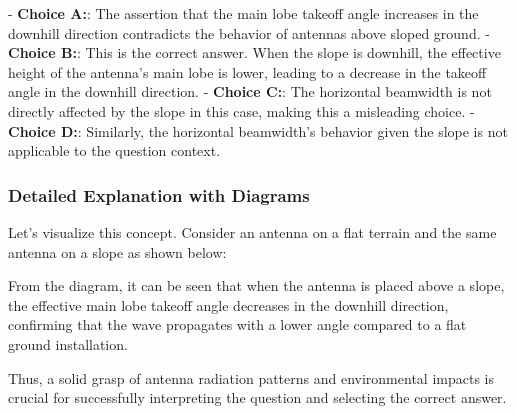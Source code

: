 - \textbf{Choice A:}: The assertion that the main lobe takeoff angle increases in the downhill direction contradicts the behavior of antennas above sloped ground.
- \textbf{Choice B:}: This is the correct answer. When the slope is downhill, the effective height of the antenna's main lobe is lower, leading to a decrease in the takeoff angle in the downhill direction. 
- \textbf{Choice C:}: The horizontal beamwidth is not directly affected by the slope in this case, making this a misleading choice.
- \textbf{Choice D:}: Similarly, the horizontal beamwidth’s behavior given the slope is not applicable to the question context.

\subsubsection{Detailed Explanation with Diagrams}

Let's visualize this concept. Consider an antenna on a flat terrain and the same antenna on a slope as shown below:


From the diagram, it can be seen that when the antenna is placed above a slope, the effective main lobe takeoff angle decreases in the downhill direction, confirming that the wave propagates with a lower angle compared to a flat ground installation.

Thus, a solid grasp of antenna radiation patterns and environmental impacts is crucial for successfully interpreting the question and selecting the correct answer.
